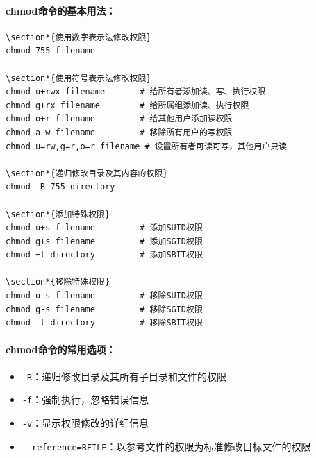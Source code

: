 \documentclass[12pt,UTF8]{ctexbook}
\begin{document}
\paragraph{chmod命令的基本用法：}
\begin{verbatim}
\section*{使用数字表示法修改权限}
chmod 755 filename

\section*{使用符号表示法修改权限}
chmod u+rwx filename       # 给所有者添加读、写、执行权限
chmod g+rx filename        # 给所属组添加读、执行权限
chmod o+r filename         # 给其他用户添加读权限
chmod a-w filename         # 移除所有用户的写权限
chmod u=rw,g=r,o=r filename # 设置所有者可读可写，其他用户只读

\section*{递归修改目录及其内容的权限}
chmod -R 755 directory

\section*{添加特殊权限}
chmod u+s filename         # 添加SUID权限
chmod g+s filename         # 添加SGID权限
chmod +t directory         # 添加SBIT权限

\section*{移除特殊权限}
chmod u-s filename         # 移除SUID权限
chmod g-s filename         # 移除SGID权限
chmod -t directory         # 移除SBIT权限
\end{verbatim}

\paragraph{chmod命令的常用选项：}
\begin{itemize}
    \item \verb+-R+：递归修改目录及其所有子目录和文件的权限
    \item \verb+-f+：强制执行，忽略错误信息
    \item \verb+-v+：显示权限修改的详细信息
    \item \verb+--reference=RFILE+：以参考文件的权限为标准修改目标文件的权限
\end{itemize}
\end{document}
